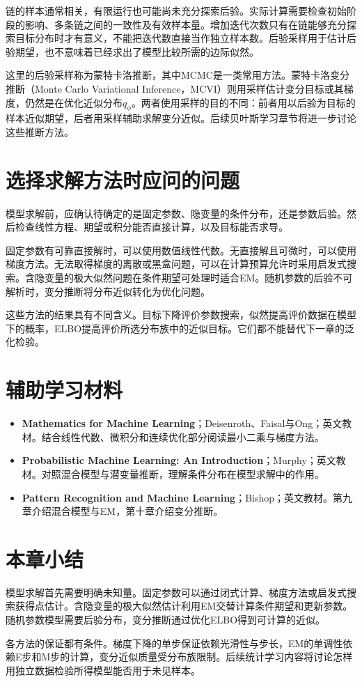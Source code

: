 链的样本通常相关，有限运行也可能尚未充分探索后验。实际计算需要检查初始阶段的影响、多条链之间的一致性及有效样本量。增加迭代次数只有在链能够充分探索目标分布时才有意义，不能把迭代数直接当作独立样本数。后验采样用于估计后验期望，也不意味着已经求出了模型比较所需的边际似然。

这里的后验采样称为蒙特卡洛推断，其中MCMC是一类常用方法。蒙特卡洛变分推断（Monte Carlo Variational Inference，MCVI）则用采样估计变分目标或其梯度，仍然是在优化近似分布$q_\phi$。两者使用采样的目的不同：前者用以后验为目标的样本近似期望，后者用采样辅助求解变分近似。后续贝叶斯学习章节将进一步讨论这些推断方法。

\section{选择求解方法时应问的问题}

模型求解前，应确认待确定的是固定参数、隐变量的条件分布，还是参数后验。然后检查线性方程、期望或积分能否直接计算，以及目标能否求导。

固定参数有可靠直接解时，可以使用数值线性代数。无直接解且可微时，可以使用梯度方法。无法取得梯度的离散或黑盒问题，可以在计算预算允许时采用启发式搜索。含隐变量的极大似然问题在条件期望可处理时适合EM。随机参数的后验不可解析时，变分推断将分布近似转化为优化问题。

这些方法的结果具有不同含义。目标下降评价参数搜索，似然提高评价数据在模型下的概率，ELBO提高评价所选分布族中的近似目标。它们都不能替代下一章的泛化检验。

\section*{辅助学习材料}
\begin{itemize}
\item \textbf{Mathematics for Machine Learning}；Deisenroth、Faisal与Ong；英文教材。结合线性代数、微积分和连续优化部分阅读最小二乘与梯度方法。\cite{deisenroth2020mml}
\item \textbf{Probabilistic Machine Learning: An Introduction}；Murphy；英文教材。对照混合模型与潜变量推断，理解条件分布在模型求解中的作用。\cite{murphy2022pml}
\item \textbf{Pattern Recognition and Machine Learning}；Bishop；英文教材。第九章介绍混合模型与EM，第十章介绍变分推断。\cite{bishop2006pattern}
\end{itemize}

\section{本章小结}

模型求解首先需要明确未知量。固定参数可以通过闭式计算、梯度方法或启发式搜索获得点估计。含隐变量的极大似然估计利用EM交替计算条件期望和更新参数。随机参数模型需要后验分布，变分推断通过优化ELBO得到可计算的近似。

各方法的保证都有条件。梯度下降的单步保证依赖光滑性与步长，EM的单调性依赖E步和M步的计算，变分近似质量受分布族限制。后续统计学习内容将讨论怎样用独立数据检验所得模型能否用于未见样本。



